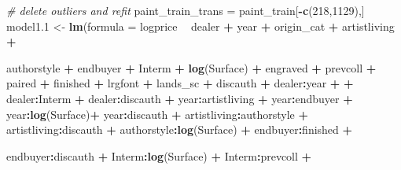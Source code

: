 \documentclass[]{article}
\newenvironment{Shaded}{\begin{snugshade}}{\end{snugshade}}
\newcommand{\CommentTok}[1]{\textcolor[rgb]{0.56,0.35,0.01}{\textit{#1}}}
\newcommand{\DataTypeTok}[1]{\textcolor[rgb]{0.13,0.29,0.53}{#1}}
\newcommand{\DecValTok}[1]{\textcolor[rgb]{0.00,0.00,0.81}{#1}}
\newcommand{\FloatTok}[1]{\textcolor[rgb]{0.00,0.00,0.81}{#1}}
\newcommand{\KeywordTok}[1]{\textcolor[rgb]{0.13,0.29,0.53}{\textbf{#1}}}
\newcommand{\NormalTok}[1]{#1}
\newcommand{\OperatorTok}[1]{\textcolor[rgb]{0.81,0.36,0.00}{\textbf{#1}}}
\newcommand{\StringTok}[1]{\textcolor[rgb]{0.31,0.60,0.02}{#1}}
\begin{document}
\begin{Shaded}
\begin{Highlighting}[]
\CommentTok{# delete outliers and refit}
\NormalTok{paint_train_trans =}\StringTok{ }\NormalTok{paint_train[}\OperatorTok{-}\KeywordTok{c}\NormalTok{(}\DecValTok{218}\NormalTok{,}\DecValTok{1129}\NormalTok{),]}
\NormalTok{model1}\FloatTok{.1}\NormalTok{ <-}\StringTok{ }\KeywordTok{lm}\NormalTok{(}\DataTypeTok{formula =}\NormalTok{ logprice }\OperatorTok{~}\StringTok{ }\NormalTok{dealer }\OperatorTok{+}\StringTok{ }\NormalTok{year }\OperatorTok{+}\StringTok{ }\NormalTok{origin_cat }\OperatorTok{+}\StringTok{ }\NormalTok{artistliving }\OperatorTok{+}\StringTok{ }

\StringTok{                   }\NormalTok{authorstyle }\OperatorTok{+}\StringTok{ }\NormalTok{endbuyer }\OperatorTok{+}\StringTok{ }\NormalTok{Interm }\OperatorTok{+}\StringTok{ }\KeywordTok{log}\NormalTok{(Surface) }\OperatorTok{+}\StringTok{ }\NormalTok{engraved }\OperatorTok{+}\StringTok{ }\NormalTok{prevcoll }\OperatorTok{+}
\StringTok{                   }\NormalTok{paired }\OperatorTok{+}\StringTok{ }\NormalTok{finished }\OperatorTok{+}\StringTok{ }\NormalTok{lrgfont }\OperatorTok{+}\StringTok{ }\NormalTok{lands_sc }\OperatorTok{+}\StringTok{ }\NormalTok{discauth }\OperatorTok{+}\StringTok{ }\NormalTok{dealer}\OperatorTok{:}\NormalTok{year }\OperatorTok{+}\StringTok{ }
\StringTok{                   }\OperatorTok{+}\StringTok{ }\NormalTok{dealer}\OperatorTok{:}\NormalTok{Interm }\OperatorTok{+}\StringTok{ }\NormalTok{dealer}\OperatorTok{:}\NormalTok{discauth }\OperatorTok{+}\StringTok{ }\NormalTok{year}\OperatorTok{:}\NormalTok{artistliving }\OperatorTok{+}\StringTok{ }
\StringTok{                   }\NormalTok{year}\OperatorTok{:}\NormalTok{endbuyer }\OperatorTok{+}\StringTok{ }\NormalTok{year}\OperatorTok{:}\KeywordTok{log}\NormalTok{(Surface)}\OperatorTok{+}\StringTok{ }\NormalTok{year}\OperatorTok{:}\NormalTok{discauth }\OperatorTok{+}\StringTok{ }
\StringTok{                   }\NormalTok{artistliving}\OperatorTok{:}\NormalTok{authorstyle }\OperatorTok{+}\StringTok{ }\NormalTok{artistliving}\OperatorTok{:}\NormalTok{discauth }\OperatorTok{+}\StringTok{ }
\StringTok{                   }\NormalTok{authorstyle}\OperatorTok{:}\KeywordTok{log}\NormalTok{(Surface) }\OperatorTok{+}\StringTok{ }\NormalTok{endbuyer}\OperatorTok{:}\NormalTok{finished }\OperatorTok{+}\StringTok{ }

\StringTok{                   }\NormalTok{endbuyer}\OperatorTok{:}\NormalTok{discauth }\OperatorTok{+}\StringTok{ }\NormalTok{Interm}\OperatorTok{:}\KeywordTok{log}\NormalTok{(Surface) }\OperatorTok{+}\StringTok{ }\NormalTok{Interm}\OperatorTok{:}\NormalTok{prevcoll }\OperatorTok{+}\StringTok{ }


\end{Highlighting}
\end{Shaded}
\end{document}
